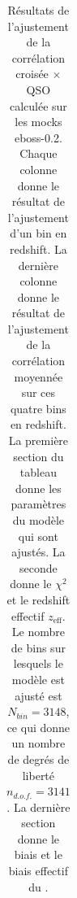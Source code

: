 \begin{table}[h]
  \centering
  \caption{Résultats de l'ajustement de la corrélation croisée \lya{}$\times$QSO calculée sur les mocks eboss-0.2. Chaque colonne donne le résultat de l'ajustement d'un bin en redshift. La dernière colonne donne le résultat de l'ajustement de la corrélation moyennée sur ces quatre bins en redshift. La première section du tableau donne les paramètres du modèle qui sont ajustés. La seconde donne le $\chi^2$ et le redshift effectif $z_{\mathrm{eff}}$. Le nombre de bins sur lesquels le modèle est ajusté est $N_{bin} = \num{3148}$, ce qui donne un nombre de degrés de liberté $n_{d.o.f.} = \num{3141}$. La dernière section donne le biais et le biais effectif du \lya{}.}
  \label{tab:xcf_eboss02_4bins}
  \footnotesize
  \begin{tabular}{lccccc}

\end{tabular}
\end{table}
